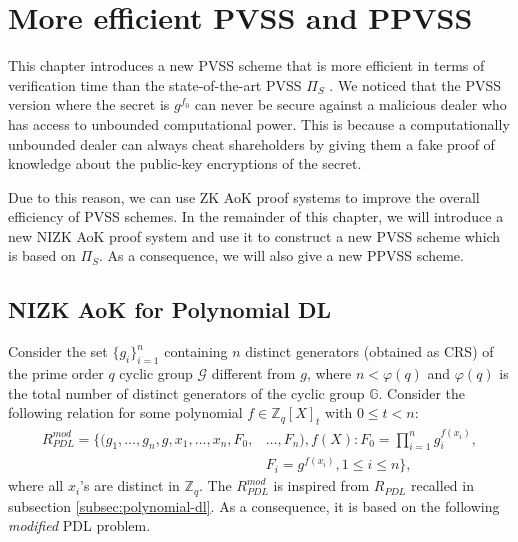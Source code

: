 \chapter{More efficient PVSS and PPVSS}
\label{cha:2}
This chapter introduces a new PVSS scheme that is more efficient in terms of verification time 
than the state-of-the-art PVSS $\Pi_{S}$ \cite{cryptoeprint:2023/1669}. We noticed that the 
PVSS version where the secret is $g^{f_0}$ can never be secure against a malicious dealer who 
has access to unbounded computational power. This is because a computationally unbounded 
dealer can always cheat shareholders by giving them a fake proof of knowledge about the 
public-key encryptions of the secret.\par 

Due to this reason, we can use ZK AoK proof systems to improve the overall efficiency of 
PVSS schemes. In the remainder of this chapter, we will introduce a new NIZK AoK proof system 
and use it to construct a new PVSS scheme which is based on $\Pi_S$. As a consequence, 
we will also give a new PPVSS scheme.

\section{NIZK AoK for Polynomial DL}
\label{sec:AoK_R_pdl}
Consider the set $\{g_i\}_{i=1}^n$ containing $n$ distinct generators (obtained as CRS) of 
the prime order $q$ cyclic group $\mathcal{G}$ different from $g$, where $n<\varphi(q)$ and $\varphi(q)$ is 
the total number of distinct generators of the cyclic group $\mathbb{G}$. Consider the following relation for 
some polynomial $f\in\mathbb{Z}_q[X]_{t}$ with $0\leq t< n$:
\begin{align}\label{eq:relation_mod_PDL_ultimate}
  R_{PDL}^{mod} = \{(g_1,\dots,g_n,g,x_1,\dots,x_n,F_0,&\dots,F_n),f(X) : F_0=\prod_{i=1}^{n}g_i^{f(x_i)},\\\nonumber &F_i=g^{f(x_i)}, 1\leq i\leq n\},
\end{align}
where all $x_i$'s are distinct in $\mathbb{Z}_q$. The $R_{PDL}^{mod}$ is inspired from $R_{PDL}$ 
\cite{cryptoeprint:2023/1669} recalled in subsection \ref{subsec:polynomial-dl}. As a consequence, 
it is based on the following \textit{modified} PDL problem.

